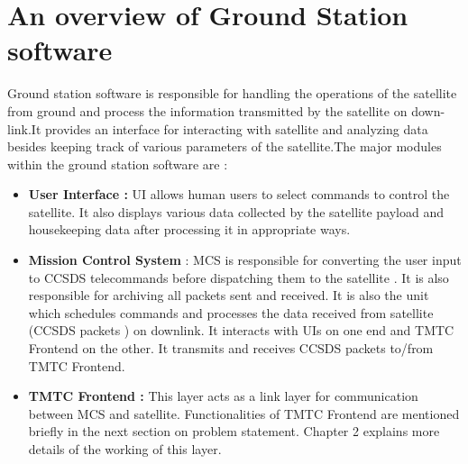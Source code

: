 \documentclass[BTech]{iitmdiss}
\begin{document}
 \section{An overview of Ground Station software}
 Ground station software is responsible for handling the operations of the satellite from ground and process the information transmitted by the satellite on down-link.It provides an interface for interacting with satellite and analyzing data besides keeping track of various parameters of the satellite.The major modules within the ground station software are : 
 
 \begin{itemize}
 \item \textbf{User Interface : }UI allows human users to select commands to control the satellite. It also displays various data collected by the satellite payload and housekeeping data after processing it in appropriate ways.
 \item \textbf{Mission Control System }: MCS is responsible for converting the user input to CCSDS telecommands before dispatching them to the satellite . It is also responsible for archiving all packets sent and received. It is also the unit which schedules commands and processes the data received from satellite (CCSDS packets ) on downlink. It interacts with UIs on one end and TMTC Frontend on the other. It transmits and receives CCSDS packets to/from TMTC Frontend.
 \item \textbf{TMTC Frontend : } This layer acts as a link layer for communication between MCS and satellite. Functionalities of TMTC Frontend are mentioned briefly in the next section on problem statement. Chapter 2 explains more details of the working of this layer.  
 \end{itemize}
\end{document}
